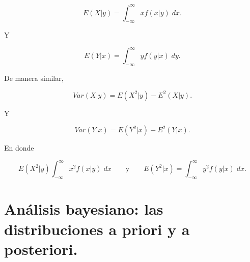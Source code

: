 \begin{tcolorbox}
    $$E(X|y)=\int_{-\infty}^\infty xf(x|y)\; dx.$$
\end{tcolorbox}

Y 

\begin{tcolorbox}
    $$E(Y|x)=\int_{-\infty}^\infty yf(y|x)\; dy.$$
\end{tcolorbox}

De manera similar,

\begin{tcolorbox}
    $$Var(X|y)=E\left(X^2|y\right)-E^2(X|y).$$
\end{tcolorbox}

Y 

\begin{tcolorbox}
    $$Var(Y|x)=E\left(Y^2|x\right)-E^2(Y|x).$$
\end{tcolorbox}

En donde 

$$E\left(X^2|y\right)\int_{-\infty}^\infty x^2 f(x|y)\; dx \qquad \mbox{y}\qquad E\left(Y^2|x\right)=\int_{-\infty}^\infty y^2f(y|x)\; dx.$$


\section{Análisis bayesiano: las distribuciones a priori y a posteriori.}

